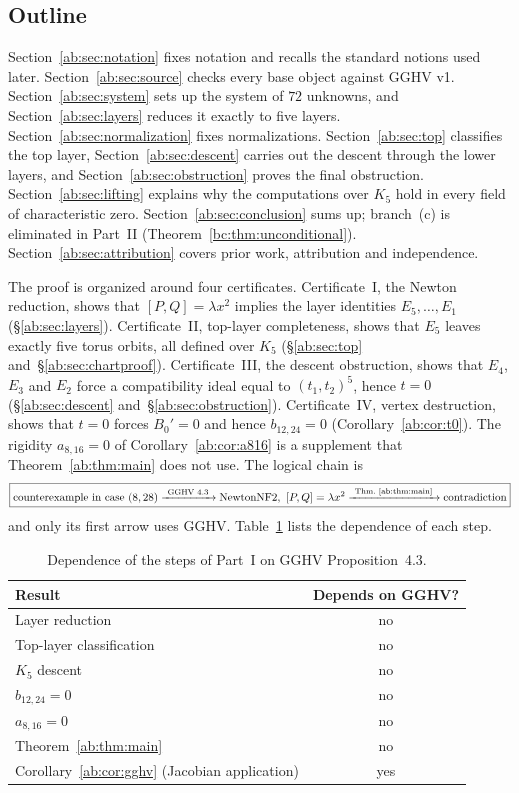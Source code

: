 \documentclass[a4paper,11pt]{article}
\let\jsOldToprule\toprule
\renewcommand{\toprule}{\jsOldToprule\rowcolor{bgheader}}
\theoremstyle{jsplain}
\theoremstyle{jsdef}
\theoremstyle{jsrem}
\begin{document}
\subsection{Outline}

Section~\ref{ab:sec:notation} fixes notation and recalls the standard notions used later. Section~\ref{ab:sec:source} checks every base object against GGHV v1. Section~\ref{ab:sec:system} sets up the system of $72$ unknowns, and Section~\ref{ab:sec:layers} reduces it exactly to five layers. Section~\ref{ab:sec:normalization} fixes normalizations. Section~\ref{ab:sec:top} classifies the top layer, Section~\ref{ab:sec:descent} carries out the descent through the lower layers, and Section~\ref{ab:sec:obstruction} proves the final obstruction. Section~\ref{ab:sec:lifting} explains why the computations over $K_5$ hold in every field of characteristic zero. Section~\ref{ab:sec:conclusion} sums up; branch~(c) is eliminated in Part~II (Theorem~\ref{bc:thm:unconditional}). Section~\ref{ab:sec:attribution} covers prior work, attribution and independence.

The proof is organized around four certificates. Certificate~I, the Newton reduction, shows that $[P,Q]=\lambda x^2$ implies the layer identities $E_5,\dots,E_1$ (\S\ref{ab:sec:layers}). Certificate~II, top-layer completeness, shows that $E_5$ leaves exactly five torus orbits, all defined over $K_5$ (\S\ref{ab:sec:top} and~\S\ref{ab:sec:chartproof}). Certificate~III, the descent obstruction, shows that $E_4$, $E_3$ and $E_2$ force a compatibility ideal equal to $(t_1,t_2)^5$, hence $t=0$ (\S\ref{ab:sec:descent} and~\S\ref{ab:sec:obstruction}). Certificate~IV, vertex destruction, shows that $t=0$ forces $B_0'=0$ and hence $b_{12,24}=0$ (Corollary~\ref{ab:cor:t0}). The rigidity $a_{8,16}=0$ of Corollary~\ref{ab:cor:a816} is a supplement that Theorem~\ref{ab:thm:main} does not use. The logical chain is
\[
\boxed{\text{counterexample in case }(8,28)\xrightarrow{\ \text{GGHV 4.3}\ } \text{NewtonNF2},\ [P,Q]=\lambda x^2 \xrightarrow{\ \text{Thm.~\ref{ab:thm:main}}\ } \text{contradiction}}
\]
and only its first arrow uses GGHV. Table~\ref{ab:tab:dependence} lists the dependence of each step.

\begin{table}[htbp]
\centering
\begin{tabular}{lc}
\toprule
Result & Depends on GGHV? \\ \midrule
Layer reduction & no \\
Top-layer classification & no \\
$K_5$ descent & no \\
$b_{12,24}=0$ & no \\
$a_{8,16}=0$ & no \\
Theorem~\ref{ab:thm:main} & no \\
Corollary~\ref{ab:cor:gghv} (Jacobian application) & yes\\
\bottomrule
\end{tabular}
\caption{Dependence of the steps of Part~I on GGHV Proposition~4.3.}
\label{ab:tab:dependence}
\end{table}
\end{document}
